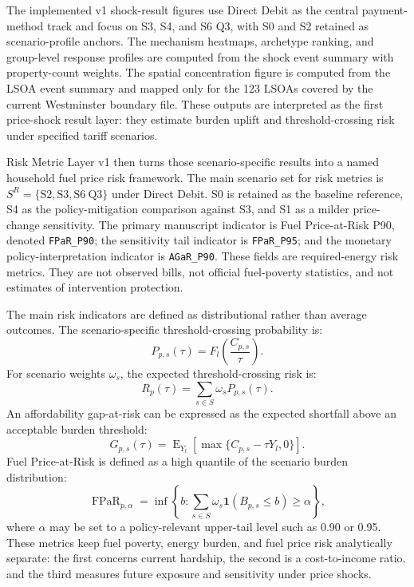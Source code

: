The implemented v1 shock-result figures use Direct Debit as the central payment-method track and focus on S3, S4, and S6 Q3, with S0 and S2 retained as scenario-profile anchors. The mechanism heatmaps, archetype ranking, and group-level response profiles are computed from the shock event summary with property-count weights. The spatial concentration figure is computed from the LSOA event summary and mapped only for the 123 LSOAs covered by the current Westminster boundary file. These outputs are interpreted as the first price-shock result layer: they estimate burden uplift and threshold-crossing risk under specified tariff scenarios.

Risk Metric Layer v1 then turns those scenario-specific results into a named household fuel price risk framework. The main scenario set for risk metrics is $S^{R}=\{\mathrm{S2},\mathrm{S3},\mathrm{S6\ Q3}\}$ under Direct Debit. S0 is retained as the baseline reference, S4 as the policy-mitigation comparison against S3, and S1 as a milder price-change sensitivity. The primary manuscript indicator is Fuel Price-at-Risk P90, denoted \texttt{FPaR\_P90}; the sensitivity tail indicator is \texttt{FPaR\_P95}; and the monetary policy-interpretation indicator is \texttt{AGaR\_P90}. These fields are required-energy risk metrics. They are not observed bills, not official fuel-poverty statistics, and not estimates of intervention protection.

The main risk indicators are defined as distributional rather than average outcomes. The scenario-specific threshold-crossing probability is:
\begin{equation}
P_{p,s}(\tau)=F_l\left(\frac{C_{p,s}}{\tau}\right).
\end{equation}
For scenario weights $\omega_s$, the expected threshold-crossing risk is:
\begin{equation}
R_{p}(\tau)=\sum_{s \in S}\omega_s P_{p,s}(\tau).
\end{equation}
An affordability gap-at-risk can be expressed as the expected shortfall above an acceptable burden threshold:
\begin{equation}
G_{p,s}(\tau)=\operatorname{E}_{Y_l}\left[\max\{C_{p,s}-\tau Y_l,0\}\right].
\end{equation}
Fuel Price-at-Risk is defined as a high quantile of the scenario burden distribution:
\begin{equation}
\operatorname{FPaR}_{p,\alpha}
=\inf \left\{b:\sum_{s \in S}\omega_s \mathbf{1}\left(B_{p,s}\leq b\right)\geq \alpha \right\},
\end{equation}
where $\alpha$ may be set to a policy-relevant upper-tail level such as 0.90 or 0.95. These metrics keep fuel poverty, energy burden, and fuel price risk analytically separate: the first concerns current hardship, the second is a cost-to-income ratio, and the third measures future exposure and sensitivity under price shocks.

